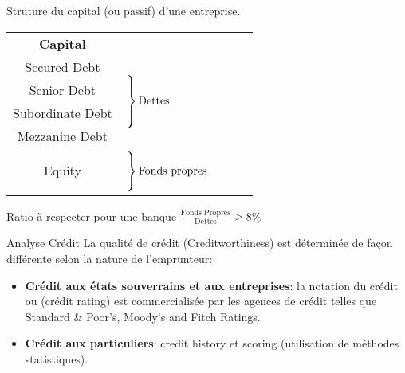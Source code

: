 \documentclass{beamer}
\begin{document}
\begin{frame}{Struture du capital (ou passif) d'une entreprise.}
\begin{overprint}
\begin{tabular}{|c|lccc}
\cline{1-1}
\textbf{Capital}\\
\cline{1-1}
\cline{1-1}
Secured Debt& \multirow{4}{*}{$\left.\rule{0cm}{1cm}\right\}{\text{Dettes}}$}&\\
Senior Debt&\\
Subordinate Debt&\\
Mezzanine Debt&\\
\cline{1-1}
& \multirow{3}{*}{$\left.\rule{0cm}{0.75cm}\right\}{\text{Fonds propres}}$}&\\
Equity\\
\\
\cline{1-1}
\end{tabular}
\vspace{0.5cm}
Ratio à respecter pour une banque $\frac{\text{Fonds Propres}}{\text{Dettes}}\geq 8\%$
\end{overprint}
\end{frame}

\begin{frame}{Analyse Crédit}
La qualité de crédit (Creditworthiness) est déterminée de façon différente selon la nature de l'emprunteur:\\
\vspace{0.5cm}
\begin{itemize}
\item \textbf{Crédit aux états souverrains et aux entreprises}: la notation du crédit ou (crédit rating) est commercialisée par les agences de crédit telles que Standard \& Poor's, Moody's and Fitch Ratings.
\item \textbf{Crédit aux particuliers}: credit history et scoring (utilisation de méthodes statistiques).
\end{itemize}
\end{frame}
\end{document}
